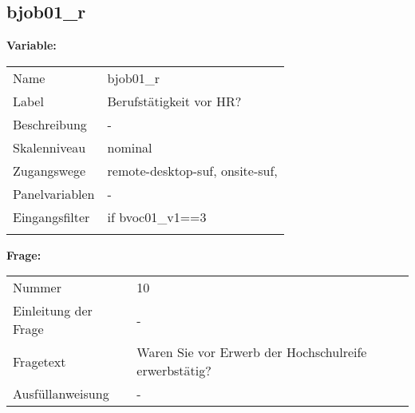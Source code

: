 	
	
	\subsection{bjob01\_r}
	\label{subSection:bjob01_r}

	\noindent\textbf{Variable:}\\
		\begin{tabular}{lL{11.3cm}}
			\label{tableVariable:bjob01_r}
			Name & bjob01\_r \\
			Label & Berufstätigkeit vor HR? \\
			Beschreibung & - \\
			Skalenniveau & nominal \\
			Zugangswege &
				remote-desktop-suf,
				onsite-suf,
 \\
			Panelvariablen & -
			 \\
			Eingangsfilter & if bvoc01\_v1==3 \\
 \\
		\end{tabular}

		\vspace*{1 cm}
		\noindent\textbf{Frage:}\\
		\begin{tabular}{lL{11.3cm}}
			\label{tableQuestion:bjob01_r}
			Nummer & 10 \\
			Einleitung der Frage & - \\
			Fragetext & Waren Sie vor Erwerb der Hochschulreife erwerbstätig? \\
			Ausfüllanweisung & - \\
		\end{tabular}





